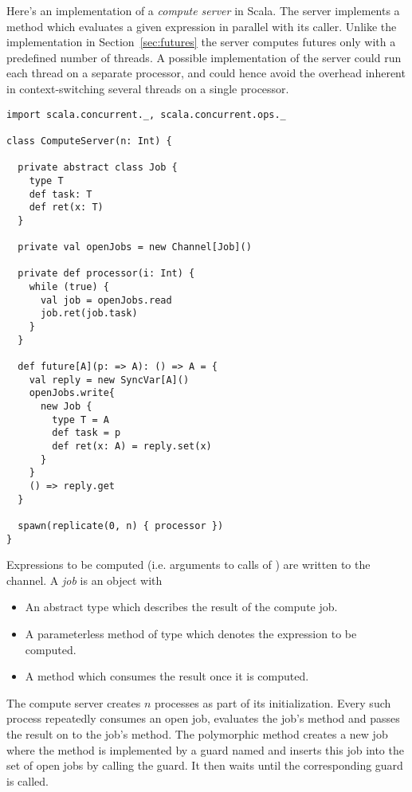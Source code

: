 {Here's an implementation of a {\em compute server} in Scala. The
server implements a  method which evaluates a given
expression in parallel with its caller. Unlike the implementation in
Section~\ref{sec:futures} the server computes futures only with a
predefined number of threads. A possible implementation of the server
could run each thread on a separate processor, and could hence avoid
the overhead inherent in context-switching several threads on a single
processor.

\begin{lstlisting}
import scala.concurrent._, scala.concurrent.ops._

class ComputeServer(n: Int) {

  private abstract class Job {
    type T
    def task: T
    def ret(x: T)
  }

  private val openJobs = new Channel[Job]()

  private def processor(i: Int) {
    while (true) {
      val job = openJobs.read
      job.ret(job.task)
    }
  }

  def future[A](p: => A): () => A = {
    val reply = new SyncVar[A]()
    openJobs.write{
      new Job {
        type T = A
        def task = p
        def ret(x: A) = reply.set(x)
      }
    }
    () => reply.get
  }

  spawn(replicate(0, n) { processor })
}
\end{lstlisting}
Expressions to be computed (i.e. arguments
to calls of ) are written to the 
channel. A {\em job} is an object with
\begin{itemize}
\item
An abstract type  which describes the result of the compute
job.
\item
A parameterless  method of type  which denotes
the expression to be computed.
\item
A  method which consumes the result once it is
computed.
\end{itemize}
The compute server creates $n$  processes as part of
its initialization.  Every such process repeatedly consumes an open
job, evaluates the job's  method and passes the result on
to the job's
 method. The polymorphic  method creates
a new job where the  method is implemented by a guard
named  and inserts this job into the set of open jobs by
calling the  guard. It then waits until the corresponding
 guard is called.

}
